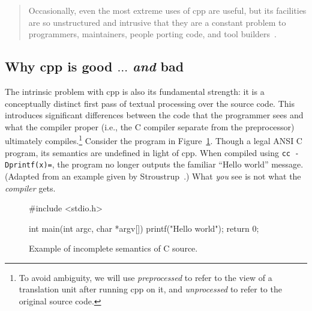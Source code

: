 \documentclass{article}
\newcommand{\Cpp}{\mbox{\textsf{cpp}}}
\newcommand{\C}{\mbox{C}}
\newcommand{\ie}{i.e.,}
\newcommand{\figref}[1]{Figure~\ref{#1}}
\begin{document}
\begin{quotation}
\noindent Occasionally, even the most extreme uses of \Cpp{} are useful, but its
facilities are so unstructured and intrusive that they are a constant
problem to programmers, maintainers, people porting code, and tool
builders~\cite[p.~424]{Stroustrup94}.
\end{quotation}

\subsection{Why \Cpp{} is good $\ldots$ \emph{and} bad}

The intrinsic problem with \Cpp{} is also its fundamental strength: it
is a conceptually distinct first pass of textual processing over the
source code.  This introduces significant differences between the code that the
programmer sees and what the compiler proper (\ie{} the \C{} compiler
separate from the preprocessor) ultimately compiles.\footnote{To avoid
  ambiguity, we will use \emph{preprocessed} to refer to the view of a
  translation unit after running \Cpp{} on it, and \emph{unprocessed} to
  refer to the original source code.} Consider the program in
\figref{fig:badmain}.  Though a legal ANSI \C{} program, its semantics are
undefined in light of \Cpp{}.  When compiled using \texttt{cc
  -Dprintf(x)=}, the program no longer outputs the familiar ``Hello
world'' message. (Adapted from an example given by
  Stroustrup~\cite[p.~423]{Stroustrup94}.)  What \emph{you} see is not
what the \emph{compiler} gets.


\begin{figure}[hbtp]
\begin{center}
\begin{small}
\begin{pseudocode}[3in]
#include <stdio.h>

int main(int argc, char *argv[]) {
  printf("Hello world");
  return 0;
}
\end{pseudocode}
\end{small}
\caption{Example of incomplete semantics of \C{} source.}
\label{fig:badmain}
\end{center}
\end{figure}
\end{document}
